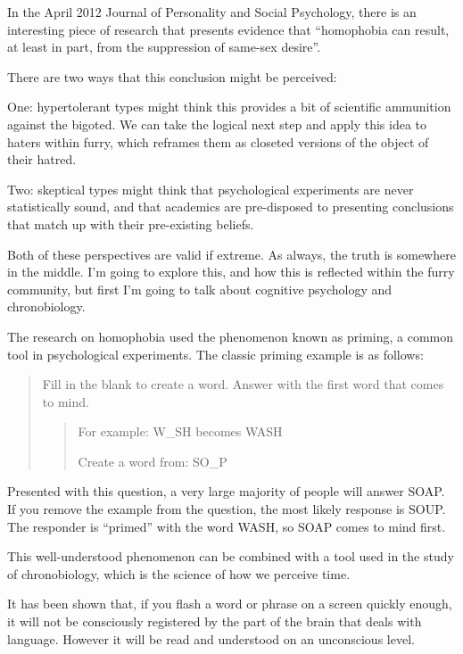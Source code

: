 
In the April 2012 Journal of Personality and Social Psychology, there is an interesting piece of research that presents evidence that ``homophobia can result, at least in part, from the suppression of same-sex desire''.

There are two ways that this conclusion might be perceived:

One: hypertolerant types might think this provides a bit of scientific ammunition against the bigoted. We can take the logical next step and apply this idea to haters within furry, which reframes them as closeted versions of the object of their hatred.

Two: skeptical types might think that psychological experiments are never statistically sound, and that academics are pre-disposed to presenting conclusions that match up with their pre-existing beliefs.

Both of these perspectives are valid if extreme. As always, the truth is somewhere in the middle. I'm going to explore this, and how this is reflected within the furry community, but first I'm going to talk about cognitive psychology and chronobiology.

The research on homophobia used the phenomenon known as priming, a common tool in psychological experiments. The classic priming example is as follows:

\begin{quotation}
  Fill in the blank to create a word. Answer with the first word that comes to mind.
  \begin{quotation}
    For example: W\_SH becomes WASH

    Create a word from: SO\_P
  \end{quotation}
\end{quotation}


Presented with this question, a very large majority of people will answer SOAP. If you remove the example from the question, the most likely response is SOUP. The responder is ``primed'' with the word WASH, so SOAP comes to mind first.

This well-understood phenomenon can be combined with a tool used in the study of chronobiology, which is the science of how we perceive time.

It has been shown that, if you flash a word or phrase on a screen quickly enough, it will not be consciously registered by the part of the brain that deals with language. However it will be read and understood on an unconscious level.

